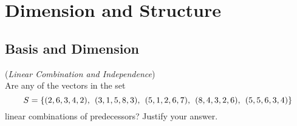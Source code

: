 
\chapter{Dimension and Structure}

\section{Basis and Dimension}

\begin{exer} (\textit{Linear Combination and Independence})\\
Are any of the vectors in the set
\vspace{1mm}
\begin{displaymath}
S = \{ (2,6,3,4,2), \hspace{1.5mm}(3,1,5,8,3), \hspace{1.5mm}(5,1,2,6,7), \hspace{1.5mm}(8,4,3,2,6), \hspace{1.5mm}(5,5,6,3,4) \}
\end{displaymath}
\vspace{1mm}
linear combinations of predecessors? Justify your answer.

\end{exer}


